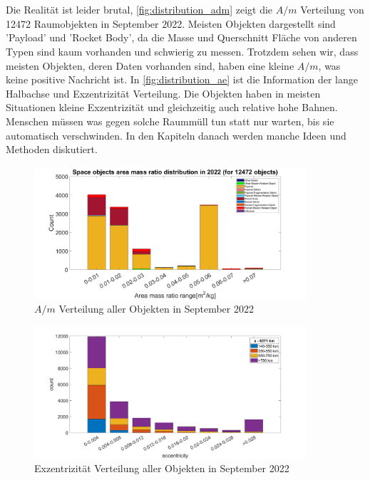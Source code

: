 \documentclass{article}
\begin{document}
\\\\
Die Realität ist leider brutal, \autoref{fig:distribution_adm} zeigt die $A/m$ Verteilung von 12472 Raumobjekten in September 2022. Meisten Objekten dargestellt sind 'Payload' und 'Rocket Body', da die Masse und Querschnitt Fläche von anderen Typen sind kaum vorhanden und schwierig zu messen. Trotzdem sehen wir, dass meisten Objekten, deren Daten vorhanden sind, haben eine kleine $A/m$, was keine positive Nachricht ist. In \autoref{fig:distribution_ae} ist die Information der lange Halbachse und Exzentrizität Verteilung. Die Objekten haben in meisten Situationen kleine Exzentrizität und gleichzeitig auch relative hohe Bahnen. Menschen müssen was gegen solche Raummüll tun statt nur warten, bis sie automatisch verschwinden. In den Kapiteln danach werden manche Ideen und Methoden diskutiert.
\begin{figure}[ht]\centering 
	\includegraphics[width=0.9\textwidth]{images/adm_plus_classification.png}
	\caption{$A/m$ Verteilung aller Objekten in September 2022}
	\label{fig:distribution_adm}
\end{figure}
\begin{figure}[ht]\centering 
	\includegraphics[width=0.9\textwidth]{images/ae_statistic.png}
	\caption{Exzentrizität Verteilung aller Objekten in September 2022}
	\label{fig:distribution_ae}
\end{figure}
\clearpage
\end{document}
